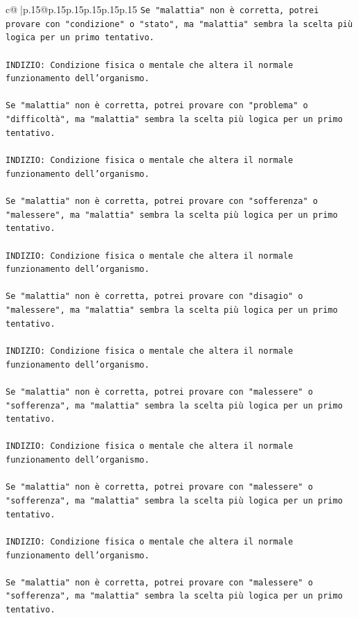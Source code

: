 \documentclass{article}
\begin{document}
{\begin{supertabular}{c@{$\;$}|p{.15\linewidth}@{}p{.15\linewidth}p{.15\linewidth}p{.15\linewidth}p{.15\linewidth}p{.15\linewidth}}
{{{\texttt{Se "malattia" non è corretta, potrei provare con "condizione" o "stato", ma "malattia" sembra la scelta più logica per un primo tentativo.} \\
\\ 
\texttt{INDIZIO: Condizione fisica o mentale che altera il normale funzionamento dell'organismo.} \\
\\ 
\texttt{Se "malattia" non è corretta, potrei provare con "problema" o "difficoltà", ma "malattia" sembra la scelta più logica per un primo tentativo.} \\
\\ 
\texttt{INDIZIO: Condizione fisica o mentale che altera il normale funzionamento dell'organismo.} \\
\\ 
\texttt{Se "malattia" non è corretta, potrei provare con "sofferenza" o "malessere", ma "malattia" sembra la scelta più logica per un primo tentativo.} \\
\\ 
\texttt{INDIZIO: Condizione fisica o mentale che altera il normale funzionamento dell'organismo.} \\
\\ 
\texttt{Se "malattia" non è corretta, potrei provare con "disagio" o "malessere", ma "malattia" sembra la scelta più logica per un primo tentativo.} \\
\\ 
\texttt{INDIZIO: Condizione fisica o mentale che altera il normale funzionamento dell'organismo.} \\
\\ 
\texttt{Se "malattia" non è corretta, potrei provare con "malessere" o "sofferenza", ma "malattia" sembra la scelta più logica per un primo tentativo.} \\
\\ 
\texttt{INDIZIO: Condizione fisica o mentale che altera il normale funzionamento dell'organismo.} \\
\\ 
\texttt{Se "malattia" non è corretta, potrei provare con "malessere" o "sofferenza", ma "malattia" sembra la scelta più logica per un primo tentativo.} \\
\\ 
\texttt{INDIZIO: Condizione fisica o mentale che altera il normale funzionamento dell'organismo.} \\
\\ 
\texttt{Se "malattia" non è corretta, potrei provare con "malessere" o "sofferenza", ma "malattia" sembra la scelta più logica per un primo tentativo.} \\
}}}
\end{supertabular}}
\end{document}
